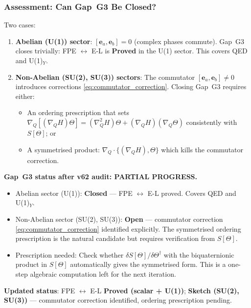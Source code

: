 \documentclass[12pt,a4paper]{article}
\theoremstyle{definition}
\theoremstyle{remark}
\begin{document}
\subsubsection{Assessment: Can Gap~G3 Be Closed?}

Two cases:
\begin{enumerate}
  \item \textbf{Abelian (U(1)) sector}: $[\mathbf{e}_a, \mathbf{e}_b] = 0$
        (complex phases commute).  Gap~G3 closes trivially:
        FPE $\leftrightarrow$ E-L is \textbf{Proved} in the U(1) sector.
        This covers QED and U(1)$_Y$.
  \item \textbf{Non-Abelian (SU(2), SU(3)) sectors}: The commutator
        $[\mathbf{e}_a, \mathbf{e}_b] \ne 0$ introduces corrections
        \eqref{eq:commutator_correction}.  Closing Gap~G3 requires either:
        \begin{itemize}
          \item An ordering prescription that sets $\nabla_Q[(\nabla_Q H)\Theta]
                = (\nabla_Q^2 H)\Theta + (\nabla_Q H)(\nabla_Q\Theta)$
                consistently with $S[\Theta]$; or
          \item A symmetrised product: $\nabla_Q \cdot \{(\nabla_Q H), \Theta\}$
                which kills the commutator correction.
        \end{itemize}
\end{enumerate}

\begin{gapbox}
\textbf{Gap~G3 status after v62 audit: PARTIAL PROGRESS.}

\begin{itemize}
  \item Abelian sector (U(1)): \textbf{Closed} — FPE $\leftrightarrow$
        E-L proved.  Covers QED and U(1)$_Y$.
  \item Non-Abelian sector (SU(2), SU(3)): \textbf{Open} — commutator
        correction \eqref{eq:commutator_correction} identified explicitly.
        The symmetrised ordering prescription is the natural candidate but
        requires verification from $S[\Theta]$.
  \item Prescription needed: Check whether $\delta S[\Theta]/\delta\Theta^\dagger$
        with the biquaternionic product in $S[\Theta]$ automatically
        gives the symmetrised form.  This is a one-step algebraic computation
        left for the next iteration.
\end{itemize}

\medskip
\textbf{Updated status}: FPE $\leftrightarrow$ E-L \textbf{Proved (scalar + U(1))};
\textbf{Sketch (SU(2), SU(3))} — commutator correction identified, ordering
prescription pending.
\end{gapbox}
\end{document}
